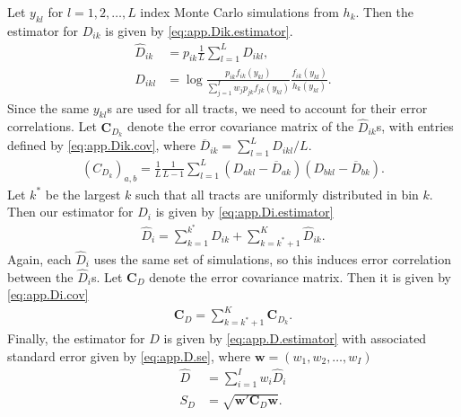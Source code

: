 \documentclass[12pt]{article}
\begin{document}
Let $y_{kl}$ for $l=1,2,\ldots,L$ index Monte Carlo simulations from $h_k$. Then the estimator for $D_{ik}$ is given by \eqref{eq:app.Dik.estimator}.
\begin{align}
  \widehat{D}_{ik} & = p_{ik}\frac{1}{L}\sum_{l=1}^LD_{ikl}, \nonumber\\
  D_{ikl} &= \log\frac{p_{ik}f_{ik}(y_{kl})}{\sum_{j=1}^{I}w_jp_{jk}f_{jk}(y_{kl})}\frac{f_{ik}(y_{kl})}{h_k(y_{kl})}.\label{eq:app.Dik.estimator}
\end{align}
Since the same $y_{kl}$s are used for all tracts, we need to account for their error correlations. Let $\bm{C}_{D_{k}}$ denote the error covariance matrix of the $\widehat{D}_{ik}$s, with entries defined by \eqref{eq:app.Dik.cov}, where $\overline{D}_{ik} = \sum_{l=1}^LD_{ikl}/L$.
\begin{align}
\left(C_{D_k}\right)_{a,b} = \frac{1}{L}\frac{1}{L-1}\sum_{l=1}^L(D_{akl} - \overline{D}_{ak})(D_{bkl} - \overline{D}_{bk}).\label{eq:app.Dik.cov}
\end{align}
Let $k^*$ be the largest $k$ such that all tracts are uniformly distributed in bin $k$. Then our estimator for $D_i$ is given by \eqref{eq:app.Di.estimator} 
\begin{align}
\widehat{D}_i = \sum_{k=1}^{k^*}D_{ik} + \sum_{k=k^* + 1}^K\widehat{D}_{ik}. \label{eq:app.Di.estimator}
\end{align}
Again, each $\widehat{D}_i$ uses the same set of simulations, so this induces error correlation between the $\widehat{D}_i$s. Let $\bm{C}_{D}$ denote the error covariance matrix. Then it is given by \eqref{eq:app.Di.cov}
\begin{align}
\bm{C}_D = \sum_{k=k^*+1}^K\bm{C}_{D_k}.\label{eq:app.Di.cov}
\end{align}
Finally, the estimator for $D$ is given by \eqref{eq:app.D.estimator} with associated standard error given by \eqref{eq:app.D.se}, where $\bm{w} = (w_1, w_2, \dots, w_I)$
\begin{align}
  \widehat{D} & = \sum_{i=1}^Iw_i\widehat{D}_i \label{eq:app.D.estimator}\\
  S_D & = \sqrt{\bm{w}' \bm{C}_D\bm{w}}. \label{eq:app.D.se}
\end{align}
\end{document}
